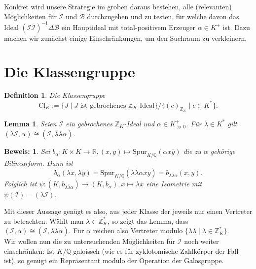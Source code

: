 \documentclass[12pt,a4paper,halfparskip,headsepline,bibtotocnumbered]{scrreprt}
\theoremstyle{nummermitklammern}
\newtheorem{definition}[defsatzusw]{Definition}
\newtheorem{lemma}[defsatzusw]{Lemma}
\theoremstyle{nonumberbreak}
\newtheorem{beweis}{Beweis:}
\newcommand{\Z}{\mathbb{Z}}
\newcommand{\Q}{\mathbb{Q}}
\newcommand{\R}{\mathbb{R}}
\newcommand{\B}{\mathcal{B}}
\newcommand{\I}{\mathcal{I}}
\begin{document}
Konkret wird unsere Strategie im groben daraus bestehen, alle (relevanten) Möglichkeiten für $\I$ und $\B$ durchzugehen und zu testen, für welche davon das Ideal $\left( \I \overline{\I} \right)^{-1} \Delta \B$ ein Hauptideal mit total-positivem Erzeuger $\alpha \in K^+$ ist. Dazu machen wir zunächst einige Einschränkungen, um den Suchraum zu verkleinern.

\section{Die Klassengruppe}

\begin{framed}
	\begin{definition}
		Die \textit{Klassengruppe} 
		\begin{equation*}
			\text{Cl}_K := \lbrace J \mid J \text{ ist gebrochenes } \Z_K \text{-Ideal} \rbrace / \lbrace (c)_{\Z_K} \mid c \in K^\ast \rbrace.
		\end{equation*}
	\end{definition}
\end{framed}


\begin{framed}
	\begin{lemma}\label{lem:squares}
		Seien $\I$ ein gebrochenes $\Z_K$-Ideal und $\alpha \in K^+_{\gg 0}$. Für $\lambda \in K^\ast$ gilt $(\lambda \I, \alpha) \cong (\I, \lambda \overline{\lambda}\alpha)$.
	\end{lemma}
\end{framed}

\begin{beweis}
	Sei $b_\alpha : K \times K \rightarrow \R, (x,y) \mapsto \text{Spur}_{K/\Q} (\alpha x \overline{y})$ die zu $\alpha$ gehörige Bilinearform. Dann ist
	\begin{equation*}
		b_\alpha(\lambda x, \lambda y) = \text{Spur}_{K/\Q} (\lambda \overline{\lambda} \alpha x \overline{y}) = b_{\lambda \overline{\lambda} \alpha} (x,y).
	\end{equation*}
	Folglich ist $\psi : (K, b_{\lambda \overline{\lambda }\alpha}) \rightarrow (K, b_\alpha), x \mapsto \lambda x$ eine Isometrie mit $\psi(\I) = (\lambda \I)$.
\end{beweis}

Mit dieser Aussage genügt es also, aus jeder Klasse der 
jeweils nur einen Vertreter zu betrachten. Wählt man $\lambda \in \Z_K^\ast$, so zeigt das Lemma, dass $(\I, \alpha) \cong (\I, \lambda \overline{\lambda} \alpha)$. Für $\alpha$ reichen also Vertreter modulo $\lbrace \lambda \overline{\lambda} \mid \lambda \in \Z_K^\ast \rbrace$.\\
Wir wollen nun die zu untersuchenden Möglichkeiten für $\I$ noch weiter einschränken: Ist $K / \Q$ galoissch (wie es für zyklotomische Zahlkörper der Fall ist), so genügt ein Repräsentant modulo der Operation der Galosgruppe.
\end{document}
